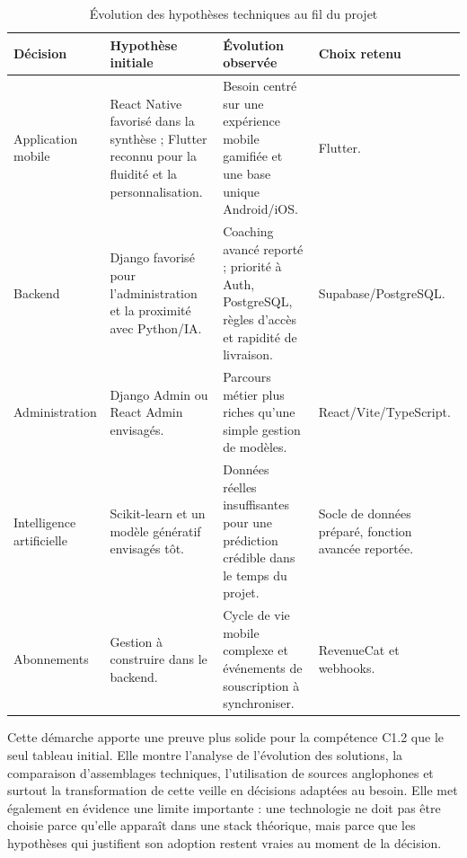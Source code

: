 \begin{table}[H]
\centering
\small
\begin{tabular}{p{3.0cm} p{4.1cm} p{4.3cm} p{3.0cm}}
\toprule
\textbf{Décision} & \textbf{Hypothèse initiale} & \textbf{Évolution observée} & \textbf{Choix retenu} \\
\midrule
Application mobile & React Native favorisé dans la synthèse ; Flutter reconnu pour la fluidité et la personnalisation. & Besoin centré sur une expérience mobile gamifiée et une base unique Android/iOS. & Flutter. \\
Backend & Django favorisé pour l'administration et la proximité avec Python/IA. & Coaching avancé reporté ; priorité à Auth, PostgreSQL, règles d'accès et rapidité de livraison. & Supabase/PostgreSQL. \\
Administration & Django Admin ou React Admin envisagés. & Parcours métier plus riches qu'une simple gestion de modèles. & React/Vite/TypeScript. \\
Intelligence artificielle & Scikit-learn et un modèle génératif envisagés tôt. & Données réelles insuffisantes pour une prédiction crédible dans le temps du projet. & Socle de données préparé, fonction avancée reportée. \\
Abonnements & Gestion à construire dans le backend. & Cycle de vie mobile complexe et événements de souscription à synchroniser. & RevenueCat et webhooks. \\
\bottomrule
\end{tabular}
\caption{Évolution des hypothèses techniques au fil du projet}
\label{tab:lynx-veille-decisions}
\end{table}

Cette démarche apporte une preuve plus solide pour la compétence C1.2 que le seul tableau initial. Elle montre l'analyse de l'évolution des solutions, la comparaison d'assemblages techniques, l'utilisation de sources anglophones et surtout la transformation de cette veille en décisions adaptées au besoin. Elle met également en évidence une limite importante : une technologie ne doit pas être choisie parce qu'elle apparaît dans une stack théorique, mais parce que les hypothèses qui justifient son adoption restent vraies au moment de la décision.
